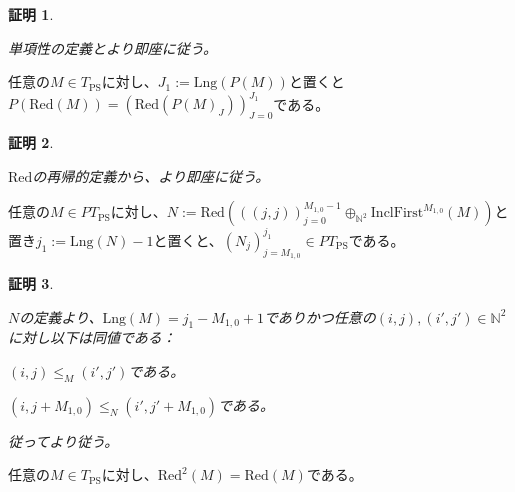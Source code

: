\documentclass[dvipdfmx,uplatex]{jsarticle}
\theoremstyle{customnonumberbreakfortheorem}
\theoremstyle{customnonumberbreakforproof}
\newtheorem{hideableproof}{証明}
\begin{document}
\begin{hideableproof}
	\begin{indented}
		\item 単項性の定義とより即座に従う。
	\end{indented}
\end{hideableproof}

\begin{corollary}\label{PのRed同変性}
	任意の\(M \in T_{\textrm{PS}}\)に対し、\(J_1 := \textrm{Lng}(P(M))\)と置くと\(P(\textrm{Red}(M)) = (\textrm{Red}(P(M)_J))_{J=0}^{J_1}\)である。
\end{corollary}

\begin{hideableproof}
	\begin{indented}
		\item \(\textrm{Red}\)の再帰的定義から、より即座に従う。
	\end{indented}
\end{hideableproof}

\begin{proposition}\label{単項性とRedの関係}
	任意の\(M \in PT_{\textrm{PS}}\)に対し、\(N := \textrm{Red}(((j,j))_{j=0}^{M_{1,0}-1} \oplus_{\mathbb{N}^2} \textrm{InclFirst}^{M_{1,0}}(M))\)と置き\(j_1 := \textrm{Lng}(N)-1\)と置くと、\((N_j)_{j=M_{1,0}}^{j_1} \in PT_{\textrm{PS}}\)である。
\end{proposition}

\begin{hideableproof}
	\begin{indented}
		\item \(N\)の定義より、\(\textrm{Lng}(M) = j_1 - M_{1,0} + 1\)でありかつ任意の\((i,j), (i',j') \in \mathbb{N}^2\)に対し以下は同値である：
		\begin{penumerate}
			\item \((i,j) \leq_M (i',j')\)である。
			\item \((i,j+M_{1,0}) \leq_N (i',j'+M_{1,0})\)である。
		\end{penumerate}
		\item 従ってより従う。
	\end{indented}
\end{hideableproof}

\begin{proposition}\label{Redの冪等性}
	任意の\(M \in T_{\textrm{PS}}\)に対し、\(\textrm{Red}^2(M) = \textrm{Red}(M)\)である。
\end{proposition}
\end{document}
